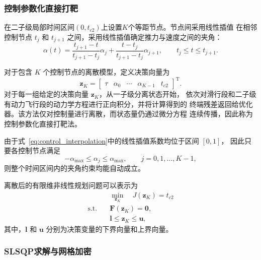 \documentclass{JXUSTmodeling}
\begin{document}
\subsubsection{控制参数化直接打靶}

在二子级局部时间区间$(0,t_{c 2})$上设置$K$个等距节点。节点间采用线性插值
在相邻控制节点 $t_j$ 和 $t_{j+1}$ 之间，采用线性插值确定推力与速度之间的夹角：
\begin{equation}
	\alpha(t)
	=
	\frac{t_{j+1}-t}{t_{j+1}-t_j}\alpha_j
	+
	\frac{t-t_j}{t_{j+1}-t_j}\alpha_{j+1},
	\qquad
	t_j\leq t\leq t_{j+1}.
	\label{eq:control_interpolation}
\end{equation}

对于包含 $K$ 个控制节点的离散模型，定义决策向量为
\begin{equation}
	\mathbf{z}_K
	=
	\begin{bmatrix}
		\tau &
		\alpha_0 &
		\cdots &
		\alpha_{K-1} &
		t_{c2}
	\end{bmatrix}^{\mathrm{T}}.
	\label{eq:decision_vector}
\end{equation}
对于每一组给定的决策向量 $\mathbf{z}_K$，从一子级分离状态开始，
依次对滑行段和二子级有动力飞行段的动力学方程进行正向积分，并将计算得到的
终端残差返回给优化器。该方法仅对控制量进行离散，而状态量仍通过微分方程
连续传播，因此称为控制参数化直接打靶法。

由于式~\eqref{eq:control_interpolation}中的线性插值系数均位于区间 $[0,1]$，
因此只要各控制节点满足
\begin{equation}
	-\alpha_{\max}
	\leq
	\alpha_j
	\leq
	\alpha_{\max},
	\qquad
	j=0,1,\ldots,K-1,
	\label{eq:node_angle_constraints}
\end{equation}
则整个时间区间内的夹角约束均能自动成立。

离散后的有限维非线性规划问题可以表示为
\begin{equation}
	\begin{aligned}
		& \underset{\mathbf{z}_K}{\min}
		\quad
		 J(\mathbf{z}_K)=t_{c2} \\
		\text{s.t.}
		\quad
		& \mathbf{F}(\mathbf{z}_K)=\mathbf{0}, \\
		& \mathbf{l}\leq\mathbf{z}_K\leq\mathbf{u},
	\end{aligned}
	\label{eq:discretized_nlp}
\end{equation}
其中，$\mathbf{l}$ 和 $\mathbf{u}$ 分别为决策变量的下界向量和上界向量。

\subsubsection{SLSQP求解与网格加密}
\label{sec:slsqp_mesh_refinement}
\end{document}
